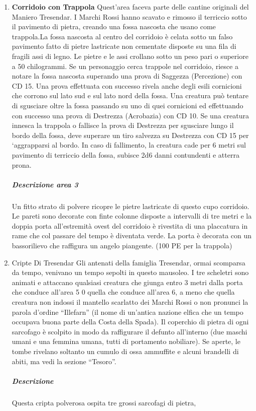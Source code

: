 \documentclass{article}
\begin{document}
\begin{enumerate}
\item \textbf{Corridoio con Trappola} Quest'area faceva parte delle cantine originali del Maniero
Tresendar. I Marchi Rossi hanno scavato e rimosso il
terriccio sotto il pavimento di pietra, creando una fossa
nascosta che usano come trappola.La fossa nascosta al centro del corridoio è celata sotto un
falso pavimento fatto di pietre lastricate non cementate
disposte su una fila di fragili assi di legno. Le pietre e le assi
crollano sotto un peso pari o superiore a 50 chilogrammi. Se
un personaggio cerca trappole nel corridoio, riesce a notare la
fossa nascosta superando una prova di Saggezza (Percezione)
con CD 15. Una prova effettuata con successo rivela anche
degli esili cornicioni che corrono sul lato sud e sul lato nord
della fossa. Una creatura può tentare di sgusciare oltre la
fossa passando su uno di quei cornicioni ed effettuando con
successo una prova di Destrezza (Acrobazia) con CD 10.
Se una creatura innesca la trappola o fallisce la prova
di Destrezza per sgusciare lungo il bordo della fossa, deve
superare un tiro salvezza su Destrezza con CD 15 per
‘aggrapparsi al bordo. In caso di fallimento, la creatura cade
per 6 metri sul pavimento di terriccio della fossa, subisce 2d6
danni contundenti e atterra prona.
\subparagraph{Descrizione area 3} Un fitto strato di polvere ricopre le pietre lastricate di questo cupo corridoio. Le pareti sono decorate con finte colonne
disposte a intervalli di tre metri e la doppia porta all'estremità
ovest del corridoio è rivestita di una placcatura in rame che col
passare del tempo è diventata verde. La porta è decorata con
un bassorilievo che raffigura un angelo piangente. (100 PE per la trappola)
\item \textbf{}{Cripte Di Tresendar}
        Gli antenati della famiglia Tresendar, ormai scomparsa da
tempo, venivano un tempo sepolti in questo mausoleo. I tre scheletri sono animati e attaccano qualsiasi creatura
che giunga entro 3 metri dalla porta che conduce all'area 5 0
quella che conduce all’area 6, a meno che quella creatura non
indossi il mantello scarlatto dei Marchi Rossi o non pronunci
la parola d'ordine “Illefarn” (il nome di un'antica nazione elfica
che un tempo occupava buona parte della Costa della Spada).
Il coperchio di pietra di ogni sarcofago è scolpito in modo
da raffigurare il defunto all’interno (due maschi umani e una
femmina umana, tutti di portamento nobiliare). Se aperte, le
tombe rivelano soltanto un cumulo di ossa ammuffite e alcuni
brandelli di abiti, ma vedi la sezione “Tesoro”.
        \subparagraph{Descrizione}Questa cripta polverosa ospita tre grossi sarcofagi di pietra,

\end{enumerate}
\end{document}
